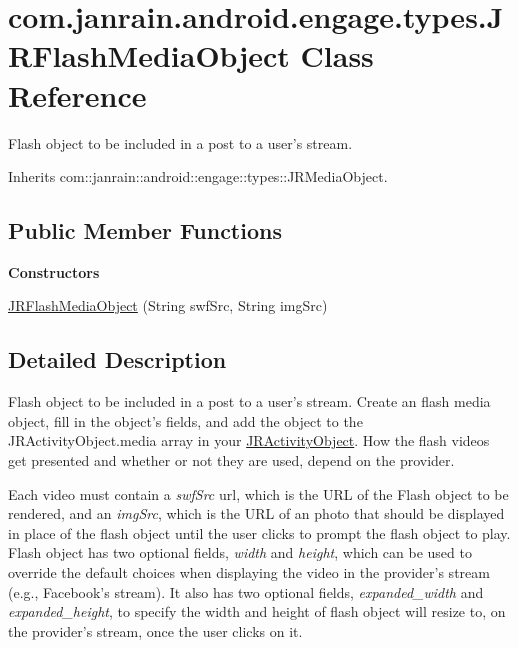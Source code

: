 \hypertarget{classcom_1_1janrain_1_1android_1_1engage_1_1types_1_1_j_r_flash_media_object}{
\section{com.janrain.android.engage.types.JRFlashMediaObject Class Reference}
\label{classcom_1_1janrain_1_1android_1_1engage_1_1types_1_1_j_r_flash_media_object}
}


Flash object to be included in a post to a user's stream.  




Inherits com::janrain::android::engage::types::JRMediaObject.

\subsection*{Public Member Functions}
\begin{Indent}{\bf Constructors}\par
{\em \label{_amgrp559a25fdb98a7d1fd1c3771ac568d5e9}
 }\begin{DoxyCompactItemize}
\item 
\hyperlink{classcom_1_1janrain_1_1android_1_1engage_1_1types_1_1_j_r_flash_media_object_a43ce407e77102f8745dd9aab7ddf2216}{JRFlashMediaObject} (String swfSrc, String imgSrc)
\end{DoxyCompactItemize}
\end{Indent}


\subsection{Detailed Description}
Flash object to be included in a post to a user's stream. Create an flash media object, fill in the object's fields, and add the object to the JRActivityObject.media array in your \hyperlink{classcom_1_1janrain_1_1android_1_1engage_1_1types_1_1_j_r_activity_object}{JRActivityObject}. How the flash videos get presented and whether or not they are used, depend on the provider.

Each video must contain a {\itshape swfSrc\/} url, which is the URL of the Flash object to be rendered, and an {\itshape imgSrc\/}, which is the URL of an photo that should be displayed in place of the flash object until the user clicks to prompt the flash object to play. Flash object has two optional fields, {\itshape width\/} and {\itshape height\/}, which can be used to override the default choices when displaying the video in the provider's stream (e.g., Facebook's stream). It also has two optional fields, {\itshape expanded\_\-width\/} and {\itshape expanded\_\-height\/}, to specify the width and height of flash object will resize to, on the provider's stream, once the user clicks on it.

